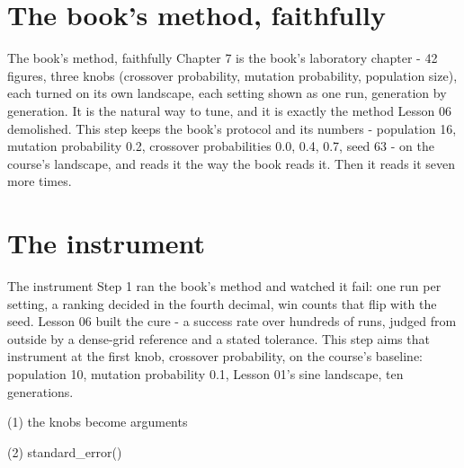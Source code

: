 \section{The book's method, faithfully}

\begin{frame}{The book's method, faithfully}
Chapter 7 is the book's laboratory chapter - 42 figures, three knobs
(crossover probability, mutation probability, population size), each turned
on its own landscape, each setting shown as one run, generation by
generation. It is the natural way to tune, and it is exactly the method
Lesson 06 demolished. This step keeps the book's protocol and its numbers -
population 16, mutation probability 0.2, crossover probabilities 0.0, 0.4,
0.7, seed 63 - on the course's landscape, and reads it the way the book
reads it. Then it reads it seven more times.
\end{frame}


\section{The instrument}

\begin{frame}{The instrument}
Step 1 ran the book's method and watched it fail: one run per setting, a
ranking decided in the fourth decimal, win counts that flip with the seed.
Lesson 06 built the cure - a success rate over hundreds of runs, judged from
outside by a dense-grid reference and a stated tolerance. This step aims that
instrument at the first knob, crossover probability, on the course's
baseline: population 10, mutation probability 0.1, Lesson 01's sine
landscape, ten generations.
\end{frame}

\begin{frame}[fragile]{(1) the knobs become arguments}

\end{frame}

\begin{frame}[fragile]{(2) standard\_error()}

\end{frame}

